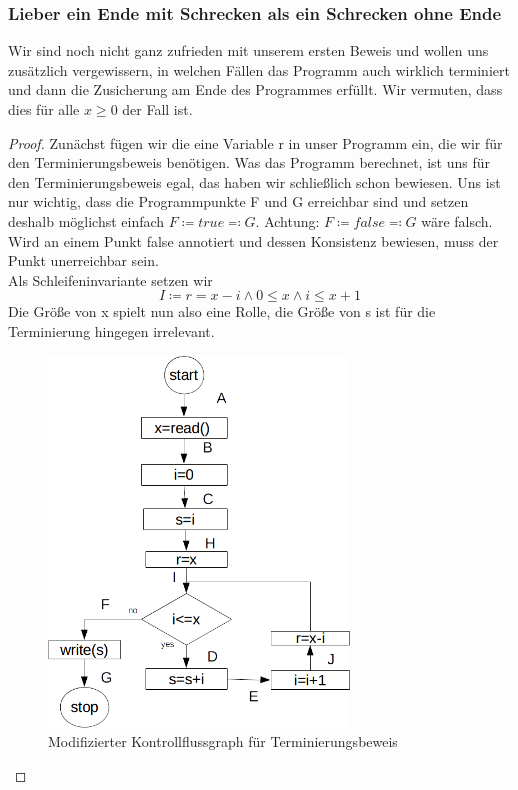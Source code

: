 \documentclass[hidelinks]{article}
\theoremstyle{plain}
\theoremstyle{definition}
\theoremstyle{rem}
\begin{document}
\begin{sloppypar}
\subsubsection{Lieber ein Ende mit Schrecken als ein Schrecken ohne Ende}
Wir sind noch nicht ganz zufrieden mit unserem ersten Beweis und wollen uns zusätzlich vergewissern, in welchen Fällen das Programm auch wirklich terminiert und dann die Zusicherung am Ende des Programmes erfüllt. Wir vermuten, dass dies für alle $x\ge 0$ der Fall ist.\\
\begin{proof}
Zunächst fügen wir die eine Variable r in unser Programm ein, die wir für den Terminierungsbeweis benötigen. Was das Programm berechnet, ist uns für den Terminierungsbeweis egal, das haben wir schließlich schon bewiesen. Uns ist nur wichtig, dass die Programmpunkte F und G erreichbar sind und setzen deshalb möglichst einfach $F\coloneqq true\eqqcolon G$. Achtung: $F\coloneqq false\eqqcolon G$ wäre falsch. Wird an einem Punkt false annotiert und dessen Konsistenz bewiesen, muss der Punkt unerreichbar sein.\\
Als Schleifeninvariante setzen wir
\begin{equation*} 
I\coloneqq r=x-i\wedge 0\le x \wedge i\le x+1 
\end{equation*}
Die Größe von x spielt nun also eine Rolle, die Größe von s ist für die Terminierung hingegen irrelevant.
\begin{figure}[H]
	\includegraphics[width=8cm]{gauss_sum_termination.png}
	\centering
	\caption{Modifizierter Kontrollflussgraph für Terminierungsbeweis}
\end{figure}

\end{proof}
\end{sloppypar}
\end{document}
